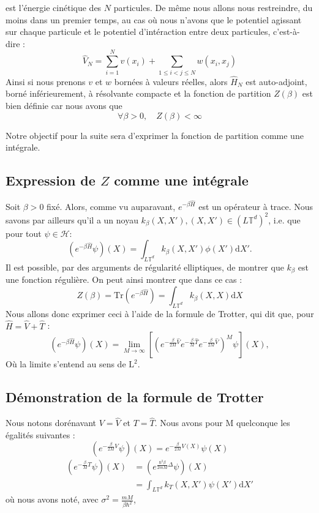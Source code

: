\documentclass[11pt]{article}
\theoremstyle{definition}
\theoremstyle{remark}
\newcommand{\hham}{\hat{H}}
\newcommand{\dom}{L\mathbb{T}^d}
\begin{document}
est l'énergie cinétique des $N$ particules.
De même nous allons nous restreindre, du moins dans un premier temps, au cas où nous n'avons que le potentiel agissant sur chaque particule et le potentiel d'intéraction entre deux particules, c'est-à-dire : 
\begin{equation}
\hat{V}_N=\sum_{i=1}^N v(x_i)+\sum_{1\leq i < j \leq N} w(x_i,x_j)
\end{equation}
Ainsi si nous prenons $v$ et $w$ bornées à valeurs réelles, alors $\hham_N$ est auto-adjoint, borné inférieurement, à résolvante compacte et la fonction de partition $Z(\beta)$ est bien définie car nous avons que 
\begin{equation}
\forall \beta>0,\quad Z(\beta)<\infty
\end{equation}

Notre objectif pour la suite sera d'exprimer la fonction de partition comme une intégrale.
\subsection{Expression de $Z$ comme une intégrale}
Soit $\beta>0$ fixé. Alors, comme vu auparavant, $e^{-\beta\hham}$ est un opérateur à trace. Nous savons par ailleurs qu'il a un noyau $k_{\beta}(X,X'), (X,X')\in(\dom)^2$, i.e. que pour tout $\psi\in \mathcal{H}$:
\begin{equation}
(e^{-\beta \hham}\psi)(X)=\int_{\dom} k_{\beta}(X,X')\phi(X')\mathrm{d}X'.
\end{equation}
Il est possible, par des arguments de régularité elliptiques, de montrer que $k_\beta$ est une fonction régulière.
On peut ainsi montrer que dans ce cas :
\begin{equation}
Z(\beta)=\mathrm{Tr}(e^{-\beta \hham})=\int_{\dom}k_\beta(X,X)\mathrm{d}X
\end{equation}
Nous allons donc exprimer ceci à l'aide de la formule de Trotter, qui dit que, pour $\hham=\hat{V}+\hat{T}$ :
\begin{equation}
(e^{-\beta \hham}\psi)(X)=\lim_{M\to \infty}\left[(e^{-\frac{\beta}{2M}\hat{V}}e^{-\frac{\beta}{M}\hat{T}}e^{-\frac{\beta}{2M}\hat{V}})^M\psi\right](X),
\end{equation}
Où la limite s'entend au sens de $\mathrm{L}^2$. 

\subsection{Démonstration de la formule de Trotter}
Nous notons dorénavant $V=\hat{V}$ et $T=\hat{T}$.
Nous avons pour M quelconque les égalités suivantes : 
\begin{equation}
(e^{-\frac{\beta}{2M}V}\psi)(X)=e^{-\frac{\beta}{2M}V(X)}\psi(X)
\end{equation}
\begin{align}
(e^{-\frac{\beta}{M}T}\psi)(X)&=(e^{\frac{\hbar^2\beta}{2mM}\Delta}\psi)(X)\\
&=\int_{\dom}k_T(X,X')\psi(X')\mathrm{d}X'
\end{align}
où nous avons noté, avec $\sigma^2=\frac{mM}{\beta \hbar^2}$, 
\end{document}
